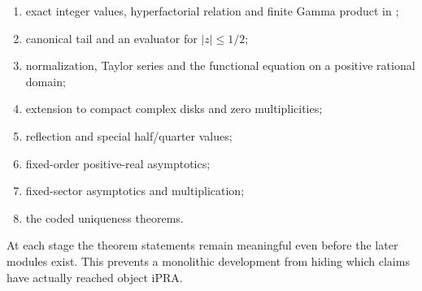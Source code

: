 \begin{enumerate}
\item exact integer values, hyperfactorial relation and finite Gamma product in
;
\item canonical tail and an evaluator for \(|z|\le1/2\);
\item normalization, Taylor series and the functional equation on a positive
rational domain;
\item extension to compact complex disks and zero multiplicities;
\item reflection and special half/quarter values;
\item fixed-order positive-real asymptotics;
\item fixed-sector asymptotics and multiplication;
\item the coded uniqueness theorems.
\end{enumerate}

At each stage the theorem statements remain meaningful even before the later
modules exist.  This prevents a monolithic development from hiding which
claims have actually reached object iPRA.
